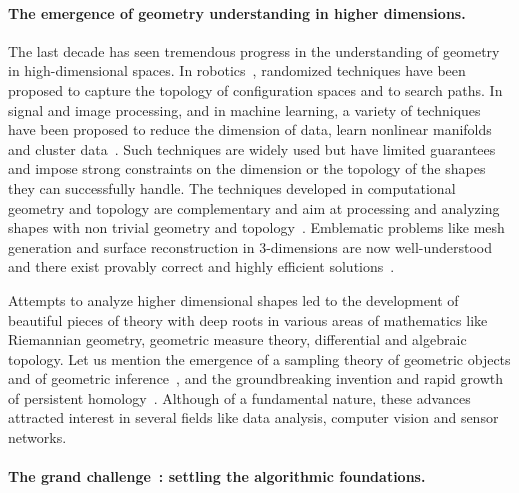 \paragraph{The emergence of geometry understanding in higher dimensions.}
The last decade has seen tremendous progress in  the understanding of geometry in high-dimensional spaces. In robotics~\cite{sml-pa-2006}, randomized techniques have been proposed to capture the topology of configuration spaces and to search paths. In signal and image processing, and in machine learning, a variety of techniques have been proposed to reduce the dimension of data, learn nonlinear manifolds and cluster data~\cite{hs-fmmds-2006}. %
Such techniques are widely used but have limited guarantees and 
impose strong constraints on the dimension or the topology of the shapes they can successfully handle. The techniques developed in computational geometry and topology are complementary  and aim at processing and analyzing shapes with non trivial geometry and topology~\cite{hh-ct-2010}. 
Emblematic problems like mesh generation and surface reconstruction in 3-dimensions are now well-understood and there exist provably correct and highly efficient solutions~\cite{geometrica-ecg-book}. 

Attempts to analyze higher dimensional shapes led to the development of beautiful pieces of theory with deep roots in various areas of mathematics like Riemannian geometry, geometric measure theory, differential and algebraic topology. Let us mention  the emergence of a sampling theory of geometric objects and of geometric inference~\cite{geometrica-ccl09}, and the groundbreaking invention and rapid growth of persistent homology~\cite{eh-ph-2008}.
Although of a fundamental nature, these advances 
attracted  interest in several fields like data analysis, computer vision and sensor networks.

\paragraph{The grand challenge~: settling the algorithmic foundations.}

